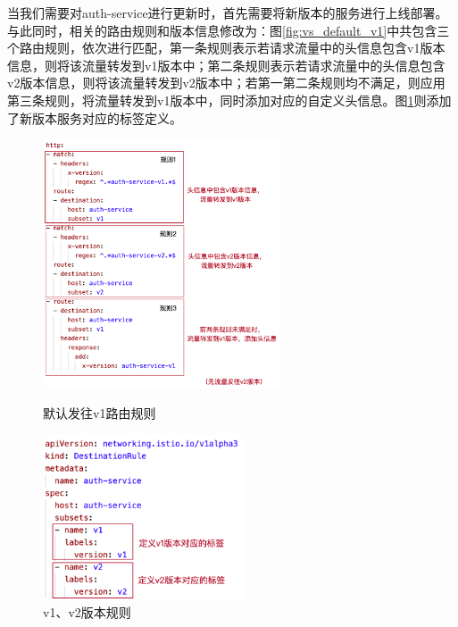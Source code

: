 \documentclass[a4paper, 12pt]{article}
\theoremstyle{definition}
\begin{document}
当我们需要对auth-service进行更新时，首先需要将新版本的服务进行上线部署。与此同时，相关的路由规则和版本信息修改为：图\ref{fig:vs_default_v1}中共包含三个路由规则，依次进行匹配，第一条规则表示若请求流量中的头信息包含v1版本信息，则将该流量转发到v1版本中；第二条规则表示若请求流量中的头信息包含v2版本信息，则将该流量转发到v2版本中；若第一第二条规则均不满足，则应用第三条规则，将流量转发到v1版本中，同时添加对应的自定义头信息。图\ref{fig:dr_v1v2}则添加了新版本服务对应的标签定义。
\begin{figure}[!htbp]
\centering
\begin{minipage}[t]{0.48\textwidth}
\centering
\centerline{\includegraphics[width=7cm]{vs_default_v1.png}}
\caption{默认发往v1路由规则}
\label{fig:vs_default_v1}
\end{minipage}
\begin{minipage}[t]{0.48\textwidth}
\centering
\centerline{\includegraphics[width=6cm]{dr_v1v2.png}}
\caption{v1、v2版本规则}
\label{fig:dr_v1v2}
\end{minipage}
\end{figure}
\end{document}
